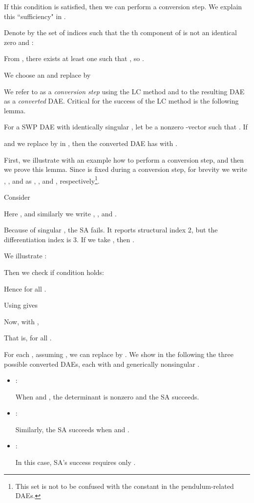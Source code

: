  If this condition is satisfied, then we can perform a conversion step. We explain this ``sufficiency" in .

Denote by  the set of indices  such that the th component of  is not an identical zero and :

From , there exists at least one  such that , so .

We choose an  and replace  by 

We refer to  as a {\em conversion step} using the LC method
and to the resulting DAE as a {\em converted} DAE. Critical for the success of the LC method is the following lemma.
\begin{theorem}\label{le:LC}
For a SWP DAE with identically singular , let  be a nonzero -vector such that .
If 

and we replace  by  in , 
then the converted DAE has  with .
\end{theorem}

First, we illustrate with an example how to perform a conversion step, and then we prove this lemma. Since  is fixed during a conversion step, for brevity we write , , and  as , , and , respectively\footnote{This set  is not to be confused with the constant  in the pendulum-related DAEs.}.

\begin{example}\label{ex:FGxy}
Consider

Here , and similarly we write , , and . 



Because of singular , the SA fails. It reports structural index 2, but the differentiation index is 3. If we take , then .

We illustrate :

Then we check if condition  holds:

Hence  for all .

Using  gives

Now, with ,

That is,  for all . 


For each , assuming , we can replace  by . We show in the following the three possible converted DAEs, each with  and generically nonsingular .

\begin{itemize}
\item :


When  and , the determinant is nonzero and the SA succeeds.

\item :


Similarly, the SA succeeds when  and .

\item :


In this case, SA's success requires only .
\end{itemize}

\end{example}

